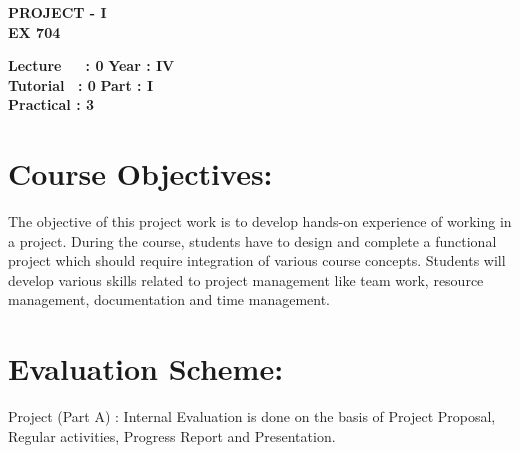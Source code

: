 \begin{center}
    \textbf{\huge{\uppercase{Project - I}}}
    \\
    \vspace{.5cm}
    \textbf{\large{EX 704}}
\end{center}

\noindent\textbf{Lecture\ \ \ : 0} \hfill \textbf{Year : IV} \\
\textbf{Tutorial \ : 0} \hfill \textbf{Part : I } \\
\textbf{Practical : 3}  \\

\par
\noindent 
\section*{Course Objectives:}
The objective of this project work is to develop hands-on experience of working in a project. During the course, students have to design and complete a functional project which should require integration of various course concepts. Students will develop various skills related to project management like team work, resource management, documentation and time management.



\section*{Evaluation Scheme:}
Project (Part A) : Internal Evaluation is done on the basis of Project Proposal, Regular activities, Progress Report and Presentation.